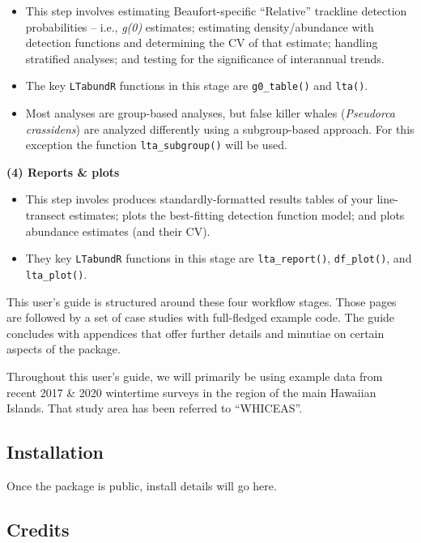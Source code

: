 \documentclass[
]{book}
\begin{document}
\begin{itemize}
\item
  This step involves estimating Beaufort-specific ``Relative'' trackline detection probabilities -- i.e., \emph{g(0)} estimates; estimating density/abundance with detection functions and determining the CV of that estimate; handling stratified analyses; and testing for the significance of interannual trends.
\item
  The key \texttt{LTabundR} functions in this stage are \texttt{g0\_table()} and \texttt{lta()}.
\item
  Most analyses are group-based analyses, but false killer whales (\emph{Pseudorca crassidens}) are analyzed differently using a subgroup-based approach. For this exception the function \texttt{lta\_subgroup()} will be used.
\end{itemize}

\textbf{(4) Reports \& plots}

\begin{itemize}
\item
  This step involes produces standardly-formatted results tables of your line-transect estimates; plots the best-fitting detection function model; and plots abundance estimates (and their CV).
\item
  They key \texttt{LTabundR} functions in this stage are \texttt{lta\_report()}, \texttt{df\_plot()}, and \texttt{lta\_plot()}.
\end{itemize}

This user's guide is structured around these four workflow stages. Those pages are followed by a set of case studies with full-fledged example code. The guide concludes with appendices that offer further details and minutiae on certain aspects of the package.

Throughout this user's guide, we will primarily be using example data from recent 2017 \& 2020 wintertime surveys in the region of the main Hawaiian Islands. That study area has been referred to ``WHICEAS''.

\hypertarget{installation}{%
\subsection*{Installation}\label{installation}}

Once the package is public, install details will go here.

\hypertarget{credits}{%
\subsection*{Credits}\label{credits}}
\end{document}

